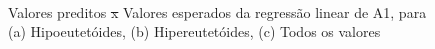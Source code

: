 \documentclass[brazil,tf,epusp]{usp}  %
\providecommand{\DIFadd}[1]{{\protect\color{blue}\uwave{#1}}} %
\providecommand{\DIFdel}[1]{{\protect\color{red}\sout{#1}}}                      %
\providecommand{\DIFaddFL}[1]{\DIFadd{#1}} %
\providecommand{\DIFdelFL}[1]{\DIFdel{#1}} %
\providecommand{\DIFaddbeginFL}{} %
\providecommand{\DIFaddendFL}{} %
\providecommand{\DIFdelbeginFL}{} %
\providecommand{\DIFdelendFL}{} %
\begin{document}
\begin{figure}[!h]
\hfill
{}\\
\caption{Valores preditos \DIFdelbeginFL \DIFdelFL{x }\DIFdelendFL \DIFaddbeginFL \DIFaddFL{vs. }\DIFaddendFL Valores esperados da regressão linear de A1, para (a) Hipoeutetóides, (b) Hipereutetóides, (c) Todos os valores}
\label{fig:LR_A1}
\end{figure}
\end{document}
